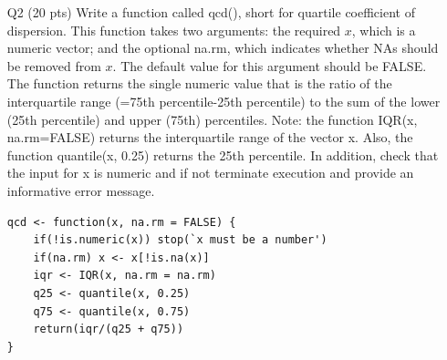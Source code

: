 \documentclass[12pt]{article}
\theoremstyle{Conjecture}
\theoremstyle{example}
\theoremstyle{remark}
\theoremstyle{lemma}
\theoremstyle{definition}
\theoremstyle{corol}
\theoremstyle{proposition}
\theoremstyle{condition}
\begin{document}
\begin{enumerate}
\newpage

\item[Q2] (20 pts) Write a function called qcd(), short for quartile
  coefficient of dispersion. This function takes two arguments: the
  required $x$, which is a numeric vector; and the optional na.rm,
  which indicates whether NAs should be removed from $x$. The default
  value for this argument should be FALSE. The function returns the
  single numeric value that is the ratio of the interquartile range
  (=75th percentile-25th percentile) to the sum of the lower (25th
  percentile) and upper (75th) percentiles. Note: the function IQR(x,
  na.rm=FALSE) returns the interquartile range of the vector x. Also,
  the function quantile(x, 0.25) returns the 25th percentile. In
  addition, check that the input for x is numeric and if not terminate
  execution and provide an informative error message.

  \begin{verbatim}
qcd <- function(x, na.rm = FALSE) {
    if(!is.numeric(x)) stop(`x must be a number')
    if(na.rm) x <- x[!is.na(x)]
    iqr <- IQR(x, na.rm = na.rm)
    q25 <- quantile(x, 0.25)
    q75 <- quantile(x, 0.75)
    return(iqr/(q25 + q75))
}
  \end{verbatim}


\end{enumerate}
\end{document}

